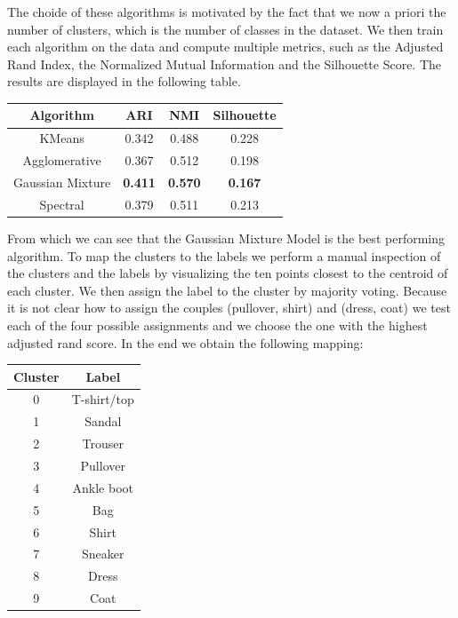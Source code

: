 The choide of these algorithms is motivated by the fact that we now
a priori the number of clusters, which is the number of classes in the
dataset. We then train each algorithm on the data and compute multiple
metrics, such as the Adjusted Rand Index, the Normalized Mutual Information and
the Silhouette Score. The results are displayed in the following table.
\begin{table}[H]
    \centering
    \begin{tabular}{|c|c|c|c|}
        \hline
        Algorithm          & ARI   & NMI   & Silhouette \\
        \hline
        KMeans             & 0.342 & 0.488 & 0.228 \\
        Agglomerative      & 0.367 & 0.512 & 0.198 \\
        Gaussian Mixture   & \textbf{0.411} & \textbf{0.570} & \textbf{0.167} \\
        Spectral           & 0.379 & 0.511 & 0.213 \\
        \hline
    \end{tabular}
\end{table}

From which we can see that the Gaussian Mixture Model is the best 
performing algorithm.
To map the clusters to the labels we perform a manual inspection of the
clusters and the labels by visualizing the ten points closest to the
centroid of each cluster. We then assign the label to the cluster by
majority voting. 
Because it is not clear how to assign the couples (pullover, shirt) and (dress, coat)
we test each of the four possible assignments and we choose the one with 
the highest adjusted rand score.
In the end we obtain the following mapping:
\begin{table}[H]
    \centering
    \begin{tabular}{|c|c|}
        \hline
        Cluster & Label \\
        \hline
        0       & T-shirt/top \\
        1       & Sandal \\
        2       & Trouser \\
        3       & Pullover \\
        4       & Ankle boot \\
        5       & Bag \\
        6       & Shirt \\
        7       & Sneaker \\
        8       & Dress \\
        9       & Coat \\
        \hline
    \end{tabular}
\end{table}


